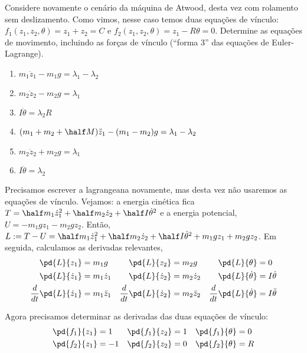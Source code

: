 \begin{question}
  	Considere novamente o cenário da máquina de Atwood, desta vez com rolamento sem deslizamento.
  	Como vimos, nesse caso temos duas equações de vínculo: $f_1(z_1, z_2, \theta) = z_1 + z_2 = C$ e $f_2(z_1, z_2, \theta) = z_1 - R\theta = 0$.
  	Determine as equações de movimento, incluindo as forças de vínculo (``forma 3'' das equações de Euler-Lagrange).

  	\begin{enumerate}
  		\item $m_1 \ddot z_1 - m_1 g = \lambda_1 - \lambda_2$ \rightanswer
  		\item $m_2 \ddot z_2 - m_2 g = \lambda_1$ \rightanswer
  		\item $I\ddot\theta = \lambda_2 R$ \rightanswer
  		\item $(m_1 + m_2 + \half M) \ddot z_1 - (m_1 - m_2)g = \lambda_1 - \lambda_2$
  		\item $m_2 \ddot z_2 + m_2 g = \lambda_1$
  		\item $I\ddot\theta = \lambda_2$
  	\end{enumerate}

    \begin{solution}
      Precisamos escrever a lagrangeana novamente, mas desta vez não usaremos as equações de vínculo.
      Vejamos: a energia cinética fica $T = \half m_1 \dot z_1^2 + \half m_2 \dot z_2 + \half I \dot\theta^2$ e a energia potencial, $U = -m_1gz_1 - m_2gz_2$.
      Então, $L := T - U = \half m_1 \dot z_1^2 + \half m_2 \dot z_2 + \half I \dot\theta^2 + m_1gz_1 + m_2gz_2$.
      Em seguida, calculamos as derivadas relevantes,
      \begin{align*}
        \pd{L}{z_1} &= m_1g
          & \pd{L}{z_2} &= m_2g
            & \pd{L}{\theta} &= 0 \\
        \pd{L}{\dot z_1} &= m_1\dot z_1
          & \pd{L}{\dot z_2} &= m_2\dot z_2
            & \pd{L}{\dot \theta} &= I \dot\theta \\
        \frac{d}{dt}\pd{L}{\dot z_1} &=m_1\ddot z_1
          & \frac{d}{dt}\pd{L}{\dot z_2} &=m_2\ddot z_2
            & \frac{d}{dt}\pd{L}{\dot \theta} &=I \ddot\theta
      \end{align*}

      Agora precisamos determinar as derivadas das duas equações de vínculo:
      \begin{align*}
        \pd{f_1}{z_1} &= 1
          & \pd{f_1}{z_2} &= 1
            & \pd{f_1}{\theta} &= 0\\
        \pd{f_2}{z_1} &= -1
          & \pd{f_2}{z_2} &= 0
            & \pd{f_2}{\theta} &= R
      \end{align*}


\end{solution}
\end{question}

